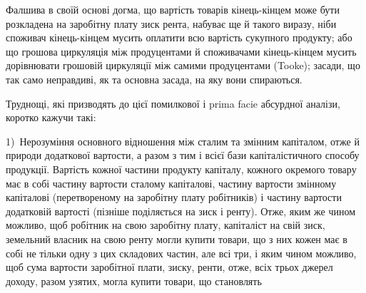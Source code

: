 Фалшива в своїй основі догма, що вартість товарів кінець-кінцем може
бути розкладена на заробітну плату \dplus{} зиск \dplus{} рента, набуває ще й такого виразу,
ніби споживач кінець-кінцем мусить оплатити всю вартість сукупного
продукту; або що грошова циркуляція між продуцентами й споживачами кінець-кінцем
мусить дорівнювати грошовій циркуляції між самими продуцентами
(Tooke); засади, що так само неправдиві, як та основна засада, на яку вони
спираються.

Труднощі, які призводять до цієї помилкової і prima facie абсурдної аналізи,
коротко кажучи такі:

1)~Нерозуміння основного відношення між сталим та змінним капіталом,
отже й природи додаткової вартости, а разом з тим і всієї бази капіталістичного
способу продукції. Вартість кожної частини продукту капіталу, кожного
окремого товару має в собі частину вартости \deq{} сталому капіталові, частину
вартости \deq{} змінному капіталові (перетвореному на заробітну плату робітників)
і частину вартости \deq{} додатковій вартості (пізніше поділяється на зиск і ренту).
Отже, яким же чином можливо, щоб робітник на свою заробітну плату, капіталіст
на свій зиск, земельний власник на свою ренту могли купити товари, що
з них кожен має в собі не тільки одну з цих складових частин, але всі три, і
яким чином можливо, щоб сума вартости заробітної плати, зиску, ренти, отже,
всіх трьох джерел доходу, разом узятих, могла купити товари, що становлять
\parbreak{}  %
